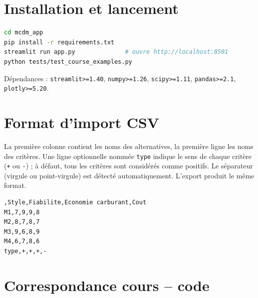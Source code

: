 \documentclass[11pt,a4paper]{report}
\theoremstyle{definition}
\theoremstyle{remark}
\begin{document}
\appendix

\chapter{Installation et lancement}

\begin{lstlisting}[language=bash,numbers=none,caption={Installation et lancement}]
cd mcdm_app
pip install -r requirements.txt
streamlit run app.py              # ouvre http://localhost:8501
python tests/test_course_examples.py
\end{lstlisting}

Dépendances : \texttt{streamlit>=1.40}, \texttt{numpy>=1.26}, \texttt{scipy>=1.11},
\texttt{pandas>=2.1}, \texttt{plotly>=5.20}.

\chapter{Format d'import CSV}

La première colonne contient les noms des alternatives, la première ligne les noms des critères. Une ligne
optionnelle nommée \texttt{type} indique le sens de chaque critère (\texttt{+} ou \texttt{-}) ; à défaut,
tous les critères sont considérés comme positifs. Le séparateur (virgule ou point-virgule) est détecté
automatiquement. L'export produit le même format.

\begin{lstlisting}[language={},numbers=none,caption={Exemple de fichier CSV}]
,Style,Fiabilite,Economie carburant,Cout
M1,7,9,9,8
M2,8,7,8,7
M3,9,6,8,9
M4,6,7,8,6
type,+,+,+,-
\end{lstlisting}

\chapter{Correspondance cours -- code}
\end{document}
